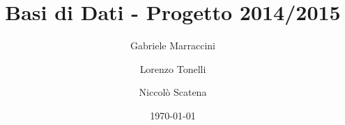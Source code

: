 \title{Basi di Dati - Progetto 2014/2015}
\author{Gabriele Marraccini \and Lorenzo Tonelli \and Niccolò Scatena}
\date{\today}
\maketitle
